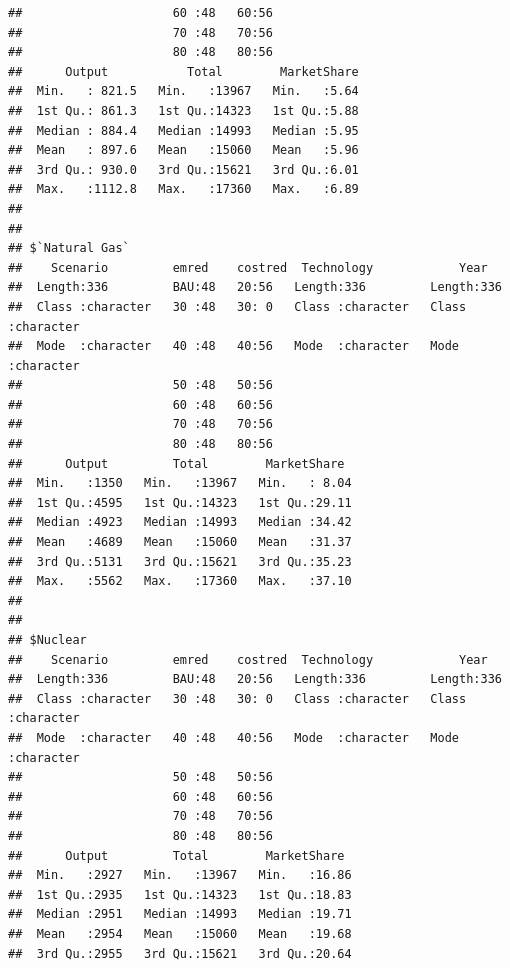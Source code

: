 \documentclass[]{article}
\begin{document}
\begin{verbatim}
##                     60 :48   60:56                                        
##                     70 :48   70:56                                        
##                     80 :48   80:56                                        
##      Output           Total        MarketShare  
##  Min.   : 821.5   Min.   :13967   Min.   :5.64  
##  1st Qu.: 861.3   1st Qu.:14323   1st Qu.:5.88  
##  Median : 884.4   Median :14993   Median :5.95  
##  Mean   : 897.6   Mean   :15060   Mean   :5.96  
##  3rd Qu.: 930.0   3rd Qu.:15621   3rd Qu.:6.01  
##  Max.   :1112.8   Max.   :17360   Max.   :6.89  
##                                                 
## 
## $`Natural Gas`
##    Scenario         emred    costred  Technology            Year          
##  Length:336         BAU:48   20:56   Length:336         Length:336        
##  Class :character   30 :48   30: 0   Class :character   Class :character  
##  Mode  :character   40 :48   40:56   Mode  :character   Mode  :character  
##                     50 :48   50:56                                        
##                     60 :48   60:56                                        
##                     70 :48   70:56                                        
##                     80 :48   80:56                                        
##      Output         Total        MarketShare   
##  Min.   :1350   Min.   :13967   Min.   : 8.04  
##  1st Qu.:4595   1st Qu.:14323   1st Qu.:29.11  
##  Median :4923   Median :14993   Median :34.42  
##  Mean   :4689   Mean   :15060   Mean   :31.37  
##  3rd Qu.:5131   3rd Qu.:15621   3rd Qu.:35.23  
##  Max.   :5562   Max.   :17360   Max.   :37.10  
##                                                
## 
## $Nuclear
##    Scenario         emred    costred  Technology            Year          
##  Length:336         BAU:48   20:56   Length:336         Length:336        
##  Class :character   30 :48   30: 0   Class :character   Class :character  
##  Mode  :character   40 :48   40:56   Mode  :character   Mode  :character  
##                     50 :48   50:56                                        
##                     60 :48   60:56                                        
##                     70 :48   70:56                                        
##                     80 :48   80:56                                        
##      Output         Total        MarketShare   
##  Min.   :2927   Min.   :13967   Min.   :16.86  
##  1st Qu.:2935   1st Qu.:14323   1st Qu.:18.83  
##  Median :2951   Median :14993   Median :19.71  
##  Mean   :2954   Mean   :15060   Mean   :19.68  
##  3rd Qu.:2955   3rd Qu.:15621   3rd Qu.:20.64  

\end{verbatim}
\end{document}
